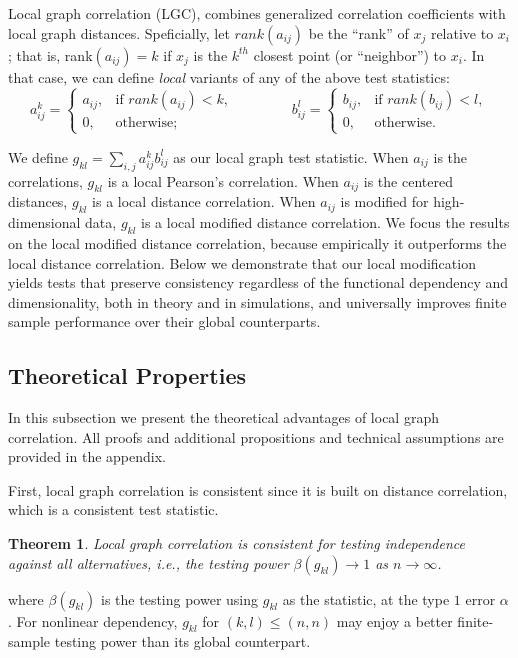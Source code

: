 \documentclass[11pt]{article}
\newtheorem{thm}{Theorem}
\begin{document}
 Local graph correlation (LGC), combines generalized correlation coefficients with local graph distances.  Speficially, let $rank(a_{ij})$  be the ``rank'' of $x_j$ relative to $x_i$; that is, rank$(a_{ij})=k$ if $x_j$ is the $k^{th}$ closest point (or ``neighbor'') to $x_i$.  In that case, we can define \emph{local} variants of any of the above test statistics:
\begin{equation}
    a_{ij}^k=
    \begin{cases}
      a_{ij}, & \text{if }rank(a_{ij}) < k, \\
      0, & \text{otherwise};
    \end{cases} \qquad \qquad
    b_{ij}^l=
    \begin{cases}
      b_{ij}, & \text{if }rank(b_{ij}) < l, \\
      0, & \text{otherwise}.
    \end{cases}
\end{equation}

We define $g_{kl}=\sum_{i,j} a_{ij}^k b_{ij}^l$ as our local graph test statistic.  
When $a_{ij}$ is the correlations, $g_{kl}$ is a local Pearson's correlation.
When $a_{ij}$ is the centered distances, $g_{kl}$ is a local distance correlation.  
When $a_{ij}$ is modified for high-dimensional data, $g_{kl}$ is a local modified distance correlation.  
We focus the results on the local modified distance correlation, because empirically it outperforms the local distance correlation.  Below we demonstrate that our local modification yields tests that preserve consistency regardless of the functional dependency and dimensionality, both in theory and in simulations, and universally improves finite sample performance over their global counterparts.






\subsection{Theoretical Properties}
\label{main4}
In this subsection we present the theoretical advantages of local graph correlation. All proofs and additional propositions and technical assumptions are provided in the appendix. 

First, local graph correlation is consistent since it is built on distance correlation, which is a consistent test statistic. 
\begin{thm}
\label{thm1}
Local graph correlation is consistent for testing independence against all alternatives, i.e., the testing power $\beta(g_{kl}) \rightarrow 1$ as $n \rightarrow \infty$. 
\end{thm}
where $\beta(g_{kl})$ is the testing power using $g_{kl}$ as the statistic, at the type $1$ error $\alpha$.
For nonlinear dependency, $g_{kl}$ for $(k,l) \leq (n,n)$ may enjoy a better finite-sample testing power than its global counterpart. 
\end{document}
